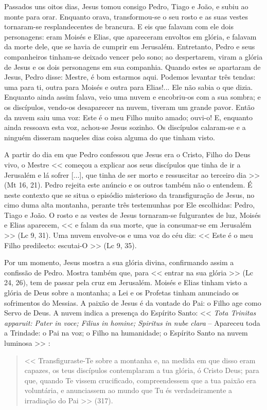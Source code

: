 \documentclass{rosario}
\begin{document}
Passados uns oitos dias, Jesus tomou consigo Pedro, Tiago e João, e subiu ao monte para orar.
Enquanto orava, transformou-se o seu rosto e as suas vestes tornaram-se resplandecentes de brancura.
E eis que falavam com ele dois personagens:
eram Moisés e Elias,
que apareceram envoltos em glória, e falavam da morte dele, que se havia de cumprir em Jerusalém.
Entretanto, Pedro e seus companheiros tinham-se deixado vencer pelo sono;
ao despertarem, viram a glória de Jesus e os dois personagens em sua companhia.
Quando estes se apartaram de Jesus, Pedro disse:
Mestre, é bom estarmos aqui.
Podemos levantar três tendas:
uma para ti, outra para Moisés e outra para Elias!...
Ele não sabia o que dizia.
Enquanto ainda assim falava, veio uma nuvem e encobriu-os com a sua sombra;
e os discípulos, vendo-os desaparecer na nuvem, tiveram um grande pavor.
Então da nuvem saiu uma voz:
Este é o meu Filho muito amado; ouvi-o!
E, enquanto ainda ressoava esta voz, achou-se Jesus sozinho.
Os discípulos calaram-se e a ninguém disseram naqueles dias coisa alguma do que tinham visto.



A partir do dia em que Pedro confessou que Jesus era o Cristo, Filho do Deus vivo, o Mestre << começou a explicar aos seus discípulos que tinha de ir a Jerusalém e lá sofrer [...], que tinha de ser morto e ressuscitar ao terceiro dia >> (Mt 16, 21).
Pedro rejeita este anúncio e os outros também não o entendem.
É neste contexto que se situa o episódio misterioso da transfiguração de Jesus, no cimo duma alta montanha, perante três testemunhas por Ele escolhidas:
Pedro, Tiago e João.
O rosto e as vestes de Jesus tornaram-se fulgurantes de luz, Moisés e Elias aparecem, << e falam da sua morte, que ia consumar-se em Jerusalém >> (Lc 9, 31).
Uma nuvem envolve-os e uma voz do céu diz:
<< Este é o meu Filho predilecto: escutai-O >> (Lc 9, 35).

Por um momento, Jesus mostra a sua glória divina, confirmando assim a confissão de Pedro.
Mostra também que, para << entrar na sua glória >> (Lc 24, 26), tem de passar pela cruz em Jerusalém.
Moisés e Elias tinham visto a glória de Deus sobre a montanha;
a Lei e os Profetas tinham anunciado os sofrimentos do Messias.
A paixão de Jesus é da vontade do Pai:
o Filho age como Servo de Deus.
A nuvem indica a presença do Espírito Santo:
<< \emph{Tota Trinitas apparuit: Pater in voce; Filius in homine; Spiritus in nube clara} -- Apareceu toda a Trindade:
o Pai na voz; o Filho na humanidade; o Espírito Santo na nuvem luminosa >> :
\begin{quote}
<< Transfiguraste-Te sobre a montanha e, na medida em que disso eram capazes, os teus discípulos contemplaram a tua glória, ó Cristo Deus;
para que, quando Te vissem crucificado, compreendessem que a tua paixão era voluntária, e anunciassem ao mundo que Tu és verdadeiramente a irradiação do Pai >> (317).
\end{quote}
\end{document}
